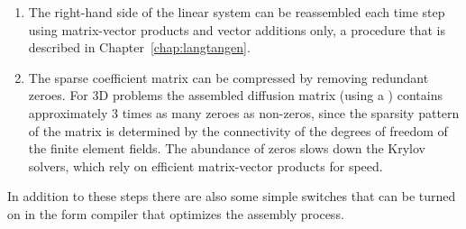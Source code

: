 \begin{enumerate}
\item The right-hand side of the linear system can be reassembled
  each time step using matrix-vector products and vector additions
  only, a procedure that is described in Chapter~\ref{chap:langtangen}.

\item The sparse coefficient matrix can be compressed by removing
  redundant zeroes. For 3D problems the assembled diffusion matrix
  (using a ) contains approximately 3 times
  as many zeroes as non-zeros, since the sparsity pattern of the
  matrix is determined by the connectivity of the degrees of freedom
  of the finite element fields. The abundance of zeros slows down the
  Krylov solvers, which rely on efficient matrix-vector products for
  speed.

\end{enumerate}
In addition to these steps there are also some simple switches that
can be turned on in the form compiler that optimizes the assembly
process.


